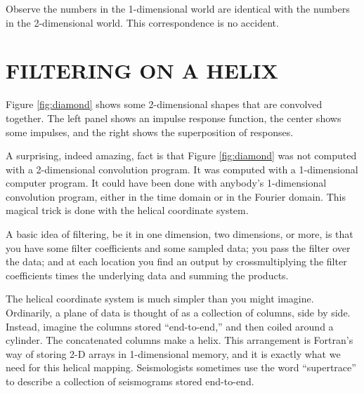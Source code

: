 
\par\noindent
Observe the numbers in the 1-dimensional world are identical
with the numbers in the 2-dimensional world.
This correspondence is no accident.


\section{FILTERING ON A HELIX}
Figure \ref{fig:diamond} shows some 2-dimensional shapes
that are convolved together.
The left panel shows an impulse response function,
the center shows some impulses,
and the right shows the superposition of responses.

\par
A surprising, indeed amazing, fact is that
Figure \ref{fig:diamond} was not computed with a 2-dimensional
convolution program.
It was computed with a 1-dimensional computer program.
It could have been done with anybody's 1-dimensional convolution program,
either in the time domain or in the Fourier domain.
This magical trick is done with the helical coordinate system.

\par
A basic idea of filtering, be it in one dimension, two dimensions, or more,
is that you have some filter coefficients and some sampled data;
you pass the filter over the data; 
and at each location you find an output by crossmultiplying
the filter coefficients times the underlying data and summing the products.

\par
The helical coordinate system is much simpler than you might imagine.
Ordinarily, a plane of data is thought of as a collection of columns,
side by side.
Instead, imagine the columns stored ``end-to-end,''
and then coiled around a cylinder.
The concatenated columns make a helix.
This arrangement is Fortran's way of storing 2-D arrays in 1-dimensional memory,
and it is exactly what we need for this helical mapping.
Seismologists sometimes use the word ``supertrace''
to describe a collection of seismograms stored end-to-end.

